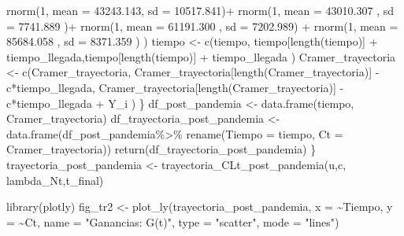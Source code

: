 \documentclass[
  us-letterpaper,
]{scrreprt}
\newenvironment{Shaded}{\begin{snugshade}}{\end{snugshade}}
\newcommand{\AttributeTok}[1]{\textcolor[rgb]{0.40,0.45,0.13}{#1}}
\newcommand{\DecValTok}[1]{\textcolor[rgb]{0.68,0.00,0.00}{#1}}
\newcommand{\FloatTok}[1]{\textcolor[rgb]{0.68,0.00,0.00}{#1}}
\newcommand{\FunctionTok}[1]{\textcolor[rgb]{0.28,0.35,0.67}{#1}}
\newcommand{\NormalTok}[1]{\textcolor[rgb]{0.00,0.23,0.31}{#1}}
\newcommand{\OtherTok}[1]{\textcolor[rgb]{0.00,0.23,0.31}{#1}}
\newcommand{\SpecialCharTok}[1]{\textcolor[rgb]{0.37,0.37,0.37}{#1}}
\newcommand{\StringTok}[1]{\textcolor[rgb]{0.13,0.47,0.30}{#1}}
\theoremstyle{plain}
\theoremstyle{plain}
\theoremstyle{definition}
\theoremstyle{remark}
\begin{document}
\begin{Shaded}
\begin{Highlighting}[]
             \FunctionTok{rnorm}\NormalTok{(}\DecValTok{1}\NormalTok{, }\AttributeTok{mean =}   \FloatTok{43243.143}\NormalTok{, }\AttributeTok{sd =} \FloatTok{10517.841}\NormalTok{)}\SpecialCharTok{+} 
             \FunctionTok{rnorm}\NormalTok{(}\DecValTok{1}\NormalTok{, }\AttributeTok{mean =} \FloatTok{43010.307}\NormalTok{  , }\AttributeTok{sd =} \FloatTok{7741.889}\NormalTok{ )}\SpecialCharTok{+} 
             \FunctionTok{rnorm}\NormalTok{(}\DecValTok{1}\NormalTok{, }\AttributeTok{mean =} \FloatTok{61191.300}\NormalTok{  , }\AttributeTok{sd =} \FloatTok{7202.989}\NormalTok{) }\SpecialCharTok{+} 
             \FunctionTok{rnorm}\NormalTok{(}\DecValTok{1}\NormalTok{, }\AttributeTok{mean =}  \FloatTok{85684.058}\NormalTok{ , }\AttributeTok{sd =} \FloatTok{8371.359}\NormalTok{ ) ) }
\NormalTok{tiempo }\OtherTok{\textless{}{-}} \FunctionTok{c}\NormalTok{(tiempo, tiempo[}\FunctionTok{length}\NormalTok{(tiempo)] }\SpecialCharTok{+}
\NormalTok{              tiempo\_llegada,tiempo[}\FunctionTok{length}\NormalTok{(tiempo)] }\SpecialCharTok{+}
\NormalTok{              tiempo\_llegada ) }
\NormalTok{Cramer\_trayectoria }\OtherTok{\textless{}{-}} \FunctionTok{c}\NormalTok{(Cramer\_trayectoria,}
\NormalTok{Cramer\_trayectoria[}\FunctionTok{length}\NormalTok{(Cramer\_trayectoria)] }\SpecialCharTok{{-}}
\NormalTok{  c}\SpecialCharTok{*}\NormalTok{tiempo\_llegada, }
\NormalTok{Cramer\_trayectoria[}\FunctionTok{length}\NormalTok{(Cramer\_trayectoria)] }\SpecialCharTok{{-}}
\NormalTok{  c}\SpecialCharTok{*}\NormalTok{tiempo\_llegada }\SpecialCharTok{+}\NormalTok{  Y\_i )}
\NormalTok{  \}}
\NormalTok{  df\_post\_pandemia }\OtherTok{\textless{}{-}} \FunctionTok{data.frame}\NormalTok{(tiempo, Cramer\_trayectoria)}
\NormalTok{df\_trayectoria\_post\_pandemia }\OtherTok{\textless{}{-}} \FunctionTok{data.frame}\NormalTok{(df\_post\_pandemia}\SpecialCharTok{\%\textgreater{}\%} 
                                        \FunctionTok{rename}\NormalTok{(}\AttributeTok{Tiempo =}\NormalTok{ tiempo,}
                                        \AttributeTok{Ct =}\NormalTok{ Cramer\_trayectoria))}
  \FunctionTok{return}\NormalTok{(df\_trayectoria\_post\_pandemia)}
\NormalTok{\}}
\NormalTok{trayectoria\_post\_pandemia }\OtherTok{\textless{}{-}} \FunctionTok{trayectoria\_CLt\_post\_pandemia}\NormalTok{(u,c,}
\NormalTok{                                              lambda\_Nt,t\_final)}


\FunctionTok{library}\NormalTok{(plotly)}
\NormalTok{fig\_tr2 }\OtherTok{\textless{}{-}} \FunctionTok{plot\_ly}\NormalTok{(trayectoria\_post\_pandemia, }\AttributeTok{x =} \SpecialCharTok{\textasciitilde{}}\NormalTok{Tiempo, }
                                              \AttributeTok{y =} \SpecialCharTok{\textasciitilde{}}\NormalTok{Ct, }
          \AttributeTok{name =} \StringTok{"Ganancias: G(t)"}\NormalTok{,}
          \AttributeTok{type =} \StringTok{"scatter"}\NormalTok{, }\AttributeTok{mode =} \StringTok{"lines"}\NormalTok{)}


\end{Highlighting}
\end{Shaded}
\end{document}
